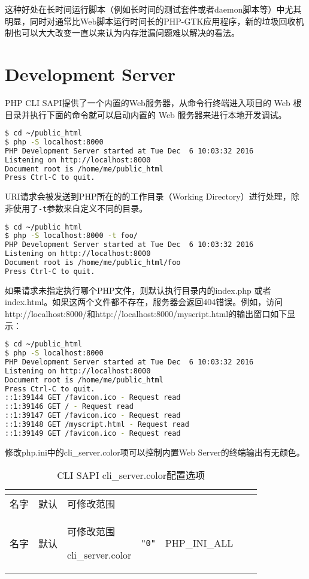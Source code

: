 这种好处在长时间运行脚本（例如长时间的测试套件或者daemon脚本等）中尤其明显，同时对通常比Web脚本运行时间长的PHP-GTK应用程序，新的垃圾回收机制也可以大大改变一直以来认为内存泄漏问题难以解决的看法。

\section{Development Server}



PHP CLI SAPI提供了一个内置的Web服务器，从命令行终端进入项目的 Web 根目录并执行下面的命令就可以启动内置的 Web 服务器来进行本地开发调试。

\begin{lstlisting}[language=bash]
$ cd ~/public_html
$ php -S localhost:8000
PHP Development Server started at Tue Dec  6 10:03:32 2016
Listening on http://localhost:8000
Document root is /home/me/public_html
Press Ctrl-C to quit.
\end{lstlisting}

URI请求会被发送到PHP所在的的工作目录（Working Directory）进行处理，除非使用了\texttt{-t}参数来自定义不同的目录。

\begin{lstlisting}[language=bash]
$ cd ~/public_html
$ php -S localhost:8000 -t foo/
PHP Development Server started at Tue Dec  6 10:03:32 2016
Listening on http://localhost:8000
Document root is /home/me/public_html/foo
Press Ctrl-C to quit.
\end{lstlisting}

如果请求未指定执行哪个PHP文件，则默认执行目录内的index.php 或者 index.html。如果这两个文件都不存在，服务器会返回404错误。例如，访问http://localhost:8000/和http://localhost:8000/myscript.html的输出窗口如下显示：

\begin{lstlisting}[language=bash]
$ cd ~/public_html
$ php -S localhost:8000
PHP Development Server started at Tue Dec  6 10:03:32 2016
Listening on http://localhost:8000
Document root is /home/me/public_html
Press Ctrl-C to quit.
::1:39144 GET /favicon.ico - Request read
::1:39146 GET / - Request read
::1:39147 GET /favicon.ico - Request read
::1:39148 GET /myscript.html - Request read
::1:39149 GET /favicon.ico - Request read
\end{lstlisting}

修改php.ini中的cli\_server.color项可以控制内置Web Server的终端输出有无颜色。


\begin{longtable}{|m{60pt}|m{30pt}|m{100pt}|}
\tabularnewline\hline
名字&默认&可修改范围
\endhead

\caption{CLI SAPI cli\_server.color配置选项}\\
\hline
名字&默认&可修改范围
\endfirsthead

\endfoot

\endlastfoot
\hline
cli\_server.color&\texttt{"0"}&PHP\_INI\_ALL\\
\hline
\end{longtable}

